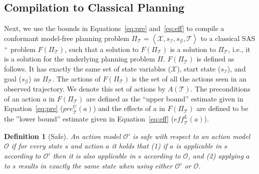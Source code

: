 \documentclass[letterpaper]{article}
\newtheorem{definition}{Definition}
\newcommand{\tuple}[1]{\ensuremath{\left \langle #1 \right \rangle }}
\newcommand{\SAS}{SAS$^+$}
\newcommand{\cmfp}{conformant model-free planning}
\newcommand{\eff}{\textit{eff}}
\newcommand{\pre}{\textit{pre}}
\begin{document}
    
    
    \subsection{Compilation to Classical Planning} 
    Next, we use the bounds in Equations~\ref{eq:pre} and~\ref{eq:eff} to compile a \cmfp{} problem 
    $\Pi_\mathcal{T}=\tuple{\mathcal{X},s_\mathcal{I}, s_\mathcal{G}, \mathcal{T}}$ 
	to a classical \SAS{} problem $F(\Pi_\mathcal{T})$, such that a solution to $F(\Pi_\mathcal{T})$ 
	is a solution to $\Pi_\mathcal{T}$, i.e., it is a solution for the underlying planning problem $\Pi$. 
	$F(\Pi_\mathcal{T})$ is defined as follows. It has exactly the same set of 
	state variables ($\mathcal{X}$), start state ($s_\mathcal{I}$), and goal ($s_\mathcal{G}$) as $\Pi_\mathcal{T}$. The actions of $F(\Pi_\mathcal{T})$ is the set of all the actions seen in an observed trajectory. We denote this set of actions by $A(\mathcal{T})$. 
	The preconditions of an action $a$ in  $F(\Pi_\mathcal{T})$ 
	are defined as the ``upper bound'' estimate given in Equation~\ref{eq:pre} ($\pre_\mathcal{T}^U(a)$) and the effects of $a$ in  $F(\Pi_\mathcal{T})$  
	are defined to be the ''lower bound'' estimate given in 
	Equation~\ref{eq:eff} ($\eff_\mathcal{T}^L(a)$).

\begin{definition}[Safe]
	An action model $\mathcal{O}'$ is safe with respect to an action model $\mathcal{O}$
	if for every state $s$ and action $a$ it holds that (1) if $a$ is applicable in $s$ according to $\mathcal{O}'$ then it is also applicable in $s$ according to $\mathcal{O}$, and (2) applying $a$ to $s$ results in exactly the same state when using either $\mathcal{O}'$ or $\mathcal{O}$. 
	\label{def:safe}
\end{definition}
	
\end{document}
